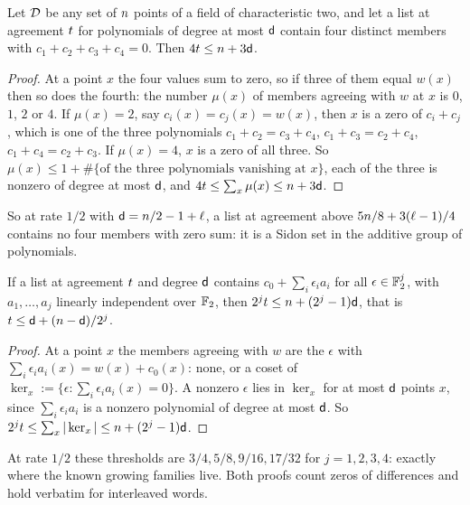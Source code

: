\begin{theorem}\label{thm:quad}
Let $\mathcal{D}$ be any set of $n$ points of a field of characteristic two, and let a list at agreement $t$ for polynomials of degree at most $\mathsf{d}$ contain four distinct members with $c_1+c_2+c_3+c_4=0$. Then $4t\le n+3\mathsf{d}$.
\end{theorem}
\begin{proof}
At a point $x$ the four values sum to zero, so if three of them equal $w(x)$ then so does the fourth: the number $\mu(x)$ of members agreeing with $w$ at $x$ is $0$, $1$, $2$ or $4$. If $\mu(x)=2$, say $c_i(x)=c_j(x)=w(x)$, then $x$ is a zero of $c_i+c_j$, which is one of the three polynomials $c_1+c_2=c_3+c_4$, $c_1+c_3=c_2+c_4$, $c_1+c_4=c_2+c_3$. If $\mu(x)=4$, $x$ is a zero of all three. So $\mu(x)\le1+\#\{\text{of the three polynomials vanishing at }x\}$, each of the three is nonzero of degree at most $\mathsf{d}$, and $4t\le\sum_x\mu(x)\le n+3\mathsf{d}$.
\end{proof}

So at rate $1/2$ with $\mathsf{d}=n/2-1+\ell$, a list at agreement above $5n/8+3(\ell-1)/4$ contains no four members with zero sum: it is a Sidon set in the additive group of polynomials.

\begin{proposition}\label{prop:affine}
If a list at agreement $t$ and degree $\mathsf{d}$ contains $c_0+\sum_i\epsilon_ia_i$ for all $\epsilon\in\mathbb{F}_2^j$, with $a_1,\dots,a_j$ linearly independent over $\mathbb{F}_2$, then $2^jt\le n+(2^j-1)\mathsf{d}$, that is $t\le\mathsf{d}+(n-\mathsf{d})/2^j$.
\end{proposition}
\begin{proof}
At a point $x$ the members agreeing with $w$ are the $\epsilon$ with $\sum_i\epsilon_ia_i(x)=w(x)+c_0(x)$: none, or a coset of $\ker_x:=\{\epsilon:\sum_i\epsilon_ia_i(x)=0\}$. A nonzero $\epsilon$ lies in $\ker_x$ for at most $\mathsf{d}$ points $x$, since $\sum_i\epsilon_ia_i$ is a nonzero polynomial of degree at most $\mathsf{d}$. So $2^jt\le\sum_x|\ker_x|\le n+(2^j-1)\mathsf{d}$.
\end{proof}

At rate $1/2$ these thresholds are $3/4,5/8,9/16,17/32$ for $j=1,2,3,4$: exactly where the known growing families live. Both proofs count zeros of differences and hold verbatim for interleaved words.

